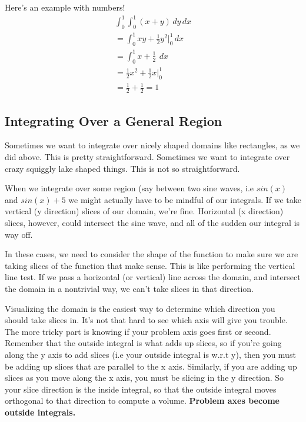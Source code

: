 \documentclass[12pt, letterpaper]{article}
\begin{document}
Here's an example with numbers!
\begin{gather*}
    \int_0^1 \int_0^1 (x+y) \,dy\,dx\\
    = \int_0^1 xy + \frac{1}{2}y^2 \biggr \rvert_0^1 \,dx\\
    = \int_0^1 x + \frac{1}{2}\ \,dx\\
    = \frac{1}{2}x^2 + \frac{1}{2}x \biggr \rvert_0^1\\
    = \frac{1}{2} + \frac{1}{2} = 1
\end{gather*}

\subsection{Integrating Over a General Region}
Sometimes we want to integrate over nicely shaped domains like rectangles, as we did above.
This is pretty straightforward.
Sometimes we want to integrate over crazy squiggly lake shaped things.
This is not so straightforward.

When we integrate over some region (say between two sine waves, i.e $sin(x)$ and $sin(x) + 5$ we might actually have to be mindful of our integrals.
If we take vertical (y direction) slices of our domain, we're fine.
Horizontal (x direction) slices, however, could intersect the sine wave, and all of the sudden our integral is way off.

In these cases, we need to consider the shape of the function to make sure we are taking slices of the function that make sense.
This is like performing the vertical line test.
If we pass a horizontal (or vertical) line across the domain, and intersect the domain in a nontrivial way, we can't take slices in that direction.

Visualizing the domain is the easiest way to determine which direction you should take slices in. 
It's not that hard to see which axis will give you trouble. 
The more tricky part is knowing if your problem axis goes first or second.
Remember that the outside integral is what adds up slices, so if you're going along the y axis to add slices (i.e your outside integral is w.r.t y), then you must be adding up slices that are parallel to the x axis.
Similarly, if you are adding up slices as you move along the x axis, you must be slicing in the y direction.
So your slice direction is the inside integral, so that the outside integral moves orthogonal to that direction to compute a volume.
\textbf{Problem axes become outside integrals.}
\end{document}
